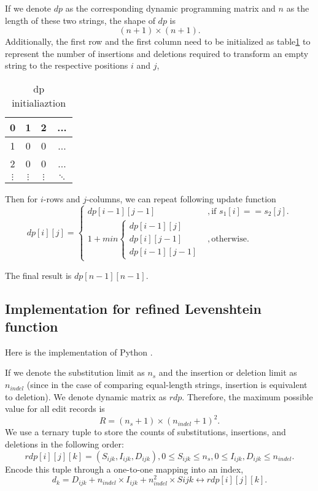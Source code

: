 \documentclass{article}
\begin{document}
If we denote $dp$ as the corresponding dynamic programming matrix and $n$ as the length of these two strings, the shape of $dp$ is 
\[(n+1)\times (n+1).\]
Additionally, the first row and the first column need to be initialized as table\ref{tab:initialization} to represent the number of insertions and deletions required to transform an empty string to the respective positions $i$ and $j$,

\begin{table}
    \centering
    \begin{tabular}{|c|c|c|c}
        \hline
        0 & 1 & 2 & ...\\
        \hline
        1 & 0 & 0 & ...\\
        \hline
        2 & 0 & 0 & ...\\
        \hline
        $\vdots$ & $\vdots$ & $\vdots$ & $\ddots$\\
    \end{tabular}
    \caption{dp initialiaztion}
    \label{tab:initialization}
\end{table}

Then for $i$-rows and $j$-columns, we can repeat following update function
\[dp[i][j] =\begin{cases}
    dp[i - 1][j - 1] &, \text{if } s_1[i] == s_2[j].\\
     1 + min \begin{cases}
        dp[i - 1][j]\\
        dp[i][j - 1]\\
        dp[i - 1][j - 1]
    \end{cases} &, \text{otherwise}.
\end{cases}\]

The final result is $dp[n - 1][n - 1]$.

\subsection{Implementation for refined Levenshtein function}
Here is the implementation of Python \cite{ref3}.

If we denote the substitution limit as $n_s$ and the insertion or deletion limit as $n_{indel}$ (since in the case of comparing equal-length strings, insertion is equivalent to deletion). We denote dynamic matrix as $rdp$. Therefore, the maximum possible value for all edit records is 
\[R = (n_s+1)\times (n_{indel}+1)^2.\]
We use a ternary tuple to store the counts of substitutions, insertions, and deletions in the following order:
\[rdp[i][j][k]=(S_{ijk}, I_{ijk}, D_{ijk}),0\le S_{ijk}\le n_{s}, 0\le I_{ijk}, D_{ijk}\le n_{indel}.\]
Encode this tuple through a one-to-one mapping into an index,
\[d_k = D_{ijk} + n_{indel} \times I_{ijk} + n_{indel} ^ 2 \times S{ijk}\leftrightarrow rdp[i][j][k].\]
\end{document}
